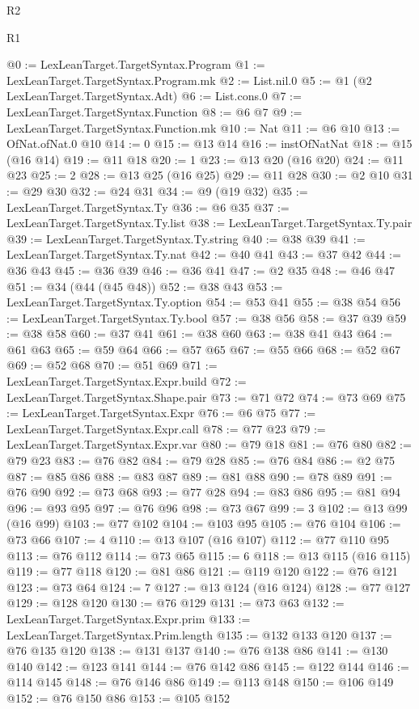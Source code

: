 \begin{lexlean}{R2}
\begin{lexlean}{R1}
\begin{coremodule}
{{{{{{{{{{{{{{{{{{{{@0 := LexLeanTarget.TargetSyntax.Program
@1 := LexLeanTarget.TargetSyntax.Program.mk
@2 := List.nil.{0}
@5 := @1 (@2 LexLeanTarget.TargetSyntax.Adt)
@6 := List.cons.{0}
@7 := LexLeanTarget.TargetSyntax.Function
@8 := @6 @7
@9 := LexLeanTarget.TargetSyntax.Function.mk
@10 := Nat
@11 := @6 @10
@13 := OfNat.ofNat.{0} @10
@14 := 0
@15 := @13 @14
@16 := instOfNatNat
@18 := @15 (@16 @14)
@19 := @11 @18
@20 := 1
@23 := @13 @20 (@16 @20)
@24 := @11 @23
@25 := 2
@28 := @13 @25 (@16 @25)
@29 := @11 @28
@30 := @2 @10
@31 := @29 @30
@32 := @24 @31
@34 := @9 (@19 @32)
@35 := LexLeanTarget.TargetSyntax.Ty
@36 := @6 @35
@37 := LexLeanTarget.TargetSyntax.Ty.list
@38 := LexLeanTarget.TargetSyntax.Ty.pair
@39 := LexLeanTarget.TargetSyntax.Ty.string
@40 := @38 @39
@41 := LexLeanTarget.TargetSyntax.Ty.nat
@42 := @40 @41
@43 := @37 @42
@44 := @36 @43
@45 := @36 @39
@46 := @36 @41
@47 := @2 @35
@48 := @46 @47
@51 := @34 (@44 (@45 @48))
@52 := @38 @43
@53 := LexLeanTarget.TargetSyntax.Ty.option
@54 := @53 @41
@55 := @38 @54
@56 := LexLeanTarget.TargetSyntax.Ty.bool
@57 := @38 @56
@58 := @37 @39
@59 := @38 @58
@60 := @37 @41
@61 := @38 @60
@63 := @38 @41 @43
@64 := @61 @63
@65 := @59 @64
@66 := @57 @65
@67 := @55 @66
@68 := @52 @67
@69 := @52 @68
@70 := @51 @69
@71 := LexLeanTarget.TargetSyntax.Expr.build
@72 := LexLeanTarget.TargetSyntax.Shape.pair
@73 := @71 @72
@74 := @73 @69
@75 := LexLeanTarget.TargetSyntax.Expr
@76 := @6 @75
@77 := LexLeanTarget.TargetSyntax.Expr.call
@78 := @77 @23
@79 := LexLeanTarget.TargetSyntax.Expr.var
@80 := @79 @18
@81 := @76 @80
@82 := @79 @23
@83 := @76 @82
@84 := @79 @28
@85 := @76 @84
@86 := @2 @75
@87 := @85 @86
@88 := @83 @87
@89 := @81 @88
@90 := @78 @89
@91 := @76 @90
@92 := @73 @68
@93 := @77 @28
@94 := @83 @86
@95 := @81 @94
@96 := @93 @95
@97 := @76 @96
@98 := @73 @67
@99 := 3
@102 := @13 @99 (@16 @99)
@103 := @77 @102
@104 := @103 @95
@105 := @76 @104
@106 := @73 @66
@107 := 4
@110 := @13 @107 (@16 @107)
@112 := @77 @110 @95
@113 := @76 @112
@114 := @73 @65
@115 := 6
@118 := @13 @115 (@16 @115)
@119 := @77 @118
@120 := @81 @86
@121 := @119 @120
@122 := @76 @121
@123 := @73 @64
@124 := 7
@127 := @13 @124 (@16 @124)
@128 := @77 @127
@129 := @128 @120
@130 := @76 @129
@131 := @73 @63
@132 := LexLeanTarget.TargetSyntax.Expr.prim
@133 := LexLeanTarget.TargetSyntax.Prim.length
@135 := @132 @133 @120
@137 := @76 @135 @120
@138 := @131 @137
@140 := @76 @138 @86
@141 := @130 @140
@142 := @123 @141
@144 := @76 @142 @86
@145 := @122 @144
@146 := @114 @145
@148 := @76 @146 @86
@149 := @113 @148
@150 := @106 @149
@152 := @76 @150 @86
@153 := @105 @152
}}}}}}}}}}}}}}}}}}}}
\end{coremodule}
\end{lexlean}
\end{lexlean}
